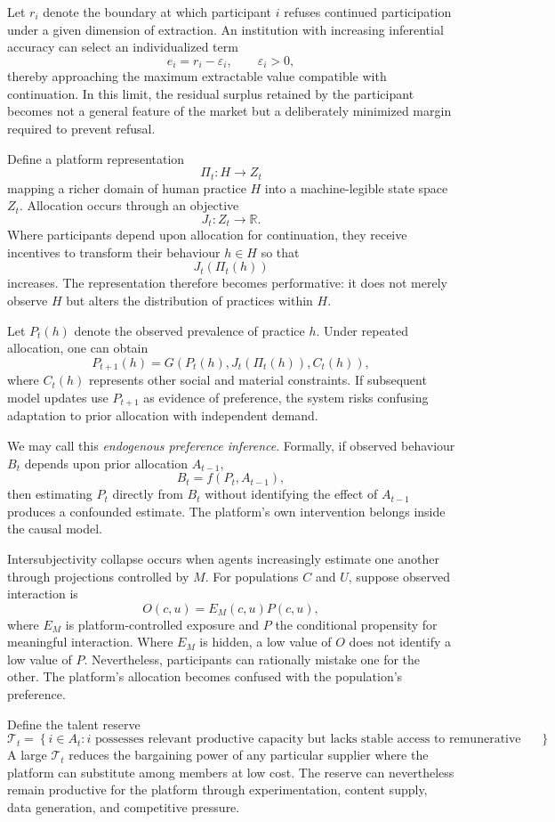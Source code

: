 \documentclass[11pt]{article}
\begin{document}
Let \(r_i\) denote the boundary at which participant \(i\) refuses continued participation under a given dimension of extraction. An institution with increasing inferential accuracy can select an individualized term
\[
e_i=r_i-\varepsilon_i,
\qquad
\varepsilon_i>0,
\]
thereby approaching the maximum extractable value compatible with continuation. In this limit, the residual surplus retained by the participant becomes not a general feature of the market but a deliberately minimized margin required to prevent refusal.

Define a platform representation
\[
\Pi_t:H\rightarrow Z_t
\]
mapping a richer domain of human practice \(H\) into a machine-legible state space \(Z_t\). Allocation occurs through an objective
\[
J_t:Z_t\rightarrow\mathbb{R}.
\]
Where participants depend upon allocation for continuation, they receive incentives to transform their behaviour \(h\in H\) so that
\[
J_t(\Pi_t(h))
\]
increases. The representation therefore becomes performative: it does not merely observe \(H\) but alters the distribution of practices within \(H\).

Let \(P_t(h)\) denote the observed prevalence of practice \(h\). Under repeated allocation, one can obtain
\[
P_{t+1}(h)
=
G\!\left(
P_t(h),
J_t(\Pi_t(h)),
C_t(h)
\right),
\]
where \(C_t(h)\) represents other social and material constraints. If subsequent model updates use \(P_{t+1}\) as evidence of preference, the system risks confusing adaptation to prior allocation with independent demand.

We may call this \emph{endogenous preference inference}. Formally, if observed behaviour \(B_t\) depends upon prior allocation \(A_{t-1}\),
\[
B_t=f(P_t,A_{t-1}),
\]
then estimating \(P_t\) directly from \(B_t\) without identifying the effect of \(A_{t-1}\) produces a confounded estimate. The platform's own intervention belongs inside the causal model.

Intersubjectivity collapse occurs when agents increasingly estimate one another through projections controlled by \(M\). For populations \(C\) and \(U\), suppose observed interaction is
\[
O(c,u)
=
E_M(c,u)P(c,u),
\]
where \(E_M\) is platform-controlled exposure and \(P\) the conditional propensity for meaningful interaction. Where \(E_M\) is hidden, a low value of \(O\) does not identify a low value of \(P\). Nevertheless, participants can rationally mistake one for the other. The platform's allocation becomes confused with the population's preference.

Define the talent reserve
\[
\mathcal{T}_t
=
\left\{
i\in A_t:
i \text{ possesses relevant productive capacity but lacks stable access to remunerative allocation}
\right\}.
\]
A large \(\mathcal{T}_t\) reduces the bargaining power of any particular supplier where the platform can substitute among members at low cost. The reserve can nevertheless remain productive for the platform through experimentation, content supply, data generation, and competitive pressure.
\end{document}
